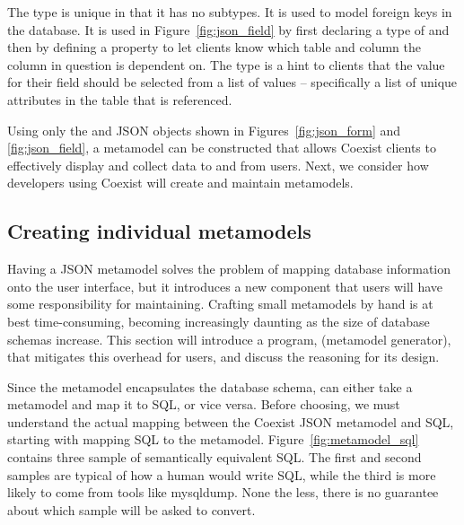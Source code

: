 The  type is unique in that it has no subtypes. It is used to
model foreign keys in the database. It is used in Figure~\ref{fig:json_field} by
first declaring a type of  and then by defining a
 property to let clients know which table and column the column
in question is dependent on. The  type is a hint to clients that
the value for their field should be selected from a list of values --
specifically a list of unique attributes in the table that is referenced.

Using only the  and  JSON objects shown in
Figures~\ref{fig:json_form} and \ref{fig:json_field}, a metamodel can be
constructed that allows Coexist clients to effectively display and collect data
to and from users. Next, we consider how developers using Coexist will create
and maintain metamodels.


\newcommand{\sql}[1]{\texttt{$#1_{sql}$}}
\newcommand{\mm}[1]{\texttt{$#1_{mm}$}}
\subsection{Creating individual metamodels}  \label{sec:}

Having a JSON metamodel solves the problem of mapping database information onto
the user interface, but it introduces a new component that users will have some
responsibility for maintaining. Crafting small metamodels by hand is at best
time-consuming, becoming increasingly daunting as the size of database
schemas increase.  This section will introduce a program,  (metamodel
generator), that mitigates this overhead for users, and discuss the reasoning
for its design.

Since the metamodel encapsulates the database schema,  can either take
a metamodel and map it to SQL, or vice versa. Before choosing, we must
understand the actual mapping between the Coexist JSON metamodel and SQL,
starting with mapping SQL to the metamodel. Figure~\ref{fig:metamodel_sql}
contains three sample of semantically equivalent SQL. The first and second
samples are typical of how a human would write SQL, while the third is more
likely to come from tools like mysqldump. None the less, there is no guarantee
about which sample  will be asked to convert.

